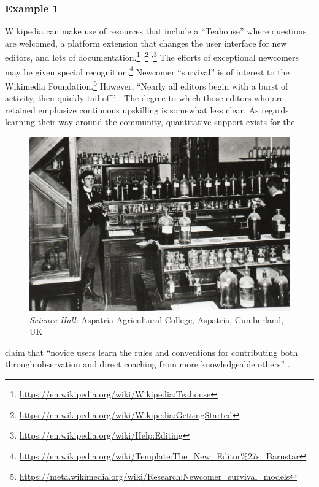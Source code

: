 \subsubsection*{Example 1} Wikipedia  can make use of resources that
include a ``Teahouse'' where questions are welcomed, a platform
extension that changes the user interface for new editors, and lots of
documentation.\footnote{\url{https://en.wikipedia.org/wiki/Wikipedia:Teahouse}}%
\textsuperscript{,}\footnote{\url{https://en.wikipedia.org/wiki/Wikipedia:GettingStarted}}%
\textsuperscript{,}\footnote{\url{https://en.wikipedia.org/wiki/Help:Editing}}
The efforts of exceptional newcomers may be given special
recognition.\footnote{\url{https://en.wikipedia.org/wiki/Template:The_New_Editor\%27s_Barnstar}}
Newcomer ``survival'' is of interest to the Wikimedia
Foundation.\footnote{\url{https://meta.wikimedia.org/wiki/Research:Newcomer_survival_models}}
However, ``Nearly all editors begin with a burst of activity, then
quickly tail off'' \cite{panciera2009wikipedians}.  The degree to
which those editors who are retained emphasize continuous upskilling
is somewhat less clear.  As regards learning their way around the
community, quantitative support exists \cite{panciera2009wikipedians}
for the 
\begin{figure}
\vspace{-.5cm}
\begin{center}
\includegraphics[width=.45\textwidth,trim=0 20 0 20, clip=true]{The_Science_Laboratory}
\end{center}
\vspace{-.5cm}
\captionsetup{font=footnotesize,width=.45\textwidth}
\caption{\textsl{Science Hall}: Aspatria Agricultural College, Aspatria, Cumberland, UK 
\label{science-laboratory}}
\vspace{-.9cm}
\end{figure}
claim that ``novice users learn the rules and conventions
for
contributing both through observation and direct coaching from more
knowledgeable others'' \cite{bryant2005becoming}.


